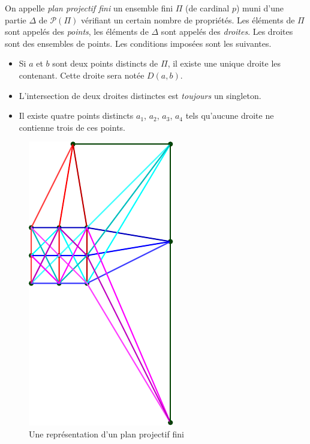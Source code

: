 On appelle \emph{plan projectif fini} un ensemble fini $\Pi$ (de cardinal $p$) muni d'une partie $\Delta$ de $\mathcal{P}(\Pi)$ vérifiant un certain nombre de propriétés. Les éléments de $\Pi$ sont appelés des \emph{points}, les éléments de $\Delta$ sont appelés des \emph{droites}. Les droites sont des ensembles de points.\newline
Les conditions imposées sont les suivantes.
\begin{itemize}
 \item Si $a$ et $b$ sont deux points distincts de $\Pi$, il existe une unique droite les contenant. Cette droite sera notée $D(a,b)$.
 \item L'intersection de deux droites distinctes est \emph{toujours} un singleton.
 \item Il existe quatre points distincts $a_1$, $a_2$, $a_3$, $a_4$ tels qu'aucune droite ne contienne trois de ces points. 
\end{itemize}
\begin{figure}[h!t]
 \centering
 \includegraphics{./Enbppf_1.pdf}
 \caption{Une représentation d'un plan projectif fini}
 \label{fig: Enbppf_1}
\end{figure}

